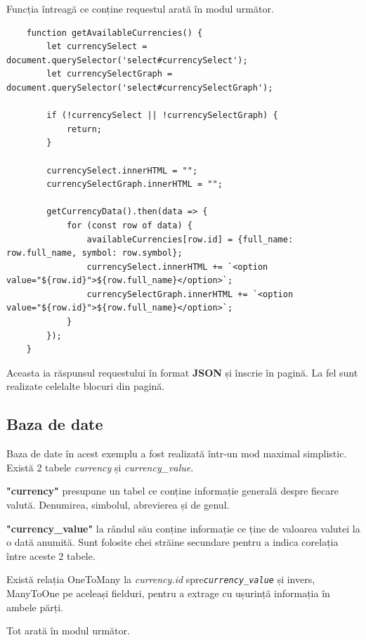 \documentclass[12pt. a4paper]{report}
\begin{document}
Funcția întreagă ce conține requestul arată în modul următor.
\begin{verbatim}
    function getAvailableCurrencies() {
        let currencySelect = document.querySelector('select#currencySelect');
        let currencySelectGraph = document.querySelector('select#currencySelectGraph');

        if (!currencySelect || !currencySelectGraph) {
            return;
        }

        currencySelect.innerHTML = "";
        currencySelectGraph.innerHTML = "";

        getCurrencyData().then(data => {
            for (const row of data) {
                availableCurrencies[row.id] = {full_name: row.full_name, symbol: row.symbol};
                currencySelect.innerHTML += `<option value="${row.id}">${row.full_name}</option>`;
                currencySelectGraph.innerHTML += `<option value="${row.id}">${row.full_name}</option>`;
            }
        });
    }
\end{verbatim}

Aceasta ia răspunsul requestului în format \textbf{JSON} și înscrie în pagină. La fel sunt realizate celelalte blocuri din pagină.

\subsection{Baza de date}

Baza de date în acest exemplu a fost realizată într-un mod maximal simplistic. Există 2 tabele \emph{currency} și \emph{currency\_value}.

\textbf{"currency"} presupune un tabel ce conține informație generală despre fiecare valută. Denumirea, simbolul, abrevierea și de genul. 

\textbf{"currency\_value"} la rândul său conține informație ce ține de valoarea valutei la o dată anumită. Sunt folosite chei străine secundare pentru a indica corelația între aceste 2 tabele.

Există relația One\-To\-Many la \emph{currency.id} spre\emph{\texttt{currency\_value}} și invers, Many\-To\-One pe aceleași fielduri, pentru a extrage cu ușurință informația în ambele părți.

Tot arată în modul următor.
\end{document}
